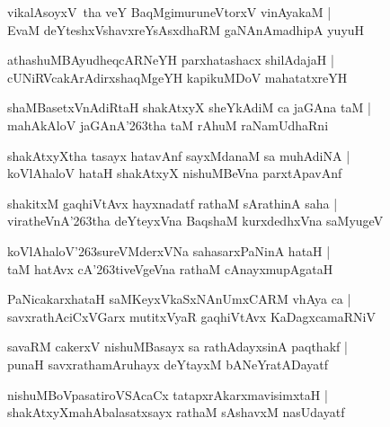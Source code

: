 \documentclass[twoside,12pt,openright]{book}
\def\S{\char'263}
\newcounter{shloka}[chapter]
\begin{document}
\begin{shloka}%
vikalAsoyxV\ tha veY BaqMgimuruneVtorxV vinAyakaM |\\
EvaM deYteshxVshavxreYsAsxdhaRM gaNAnAmadhipA yuyuH 
\end{shloka}

\begin{shloka}%
athashuMBAyudheqcARNeYH parxhatashacx shilAdajaH |\\
cUNiRVcakArAdirxshaqMgeYH kapikuMDoV mahatatxreYH
\end{shloka}

\begin{shloka}%
shaMBasetxVnAdiRtaH shakAtxyX sheYkAdiM ca jaGAna taM |\\
mahAkAloV jaGAnA\S tha taM rAhuM raNamUdhaRni
\end{shloka}

\begin{shloka}%
shakAtxyXtha tasayx hatavAnf sayxMdanaM sa muhAdiNA |\\
koVlAhaloV hataH shakAtxyX nishuMBeVna parxtApavAnf
\end{shloka}

\begin{shloka}%
shakitxM gaqhiVtAvx hayxnadatf rathaM sArathinA saha |\\
viratheVnA\S tha deYteyxVna BaqshaM kurxdedhxVna saMyugeV
\end{shloka}

\begin{shloka}%
koVlAhaloV\S sureVMderxVNa sahasarxPaNinA hataH |\\
taM hatAvx cA\S tiveVgeVna rathaM cAnayxmupAgataH 
\end{shloka}

\begin{shloka}%
PaNicakarxhataH saMKeyxVkaSxNAnUmxCARM vhAya ca |\\
savxrathAciCxVGarx mutitxVyaR gaqhiVtAvx KaDagxcamaRNiV 
\end{shloka}

\begin{shloka}%
savaRM cakerxV nishuMBasayx sa rathAdayxsinA paqthakf |\\
punaH savxrathamAruhayx deYtayxM bANeYratADayatf
\end{shloka}

\begin{shloka}%
nishuMBoVpasatiroVSAcaCx tatapxrAkarxmavisimxtaH |\\
shakAtxyXmahAbalasatxsayx rathaM sAshavxM nasUdayatf
\end{shloka}
\end{document}
